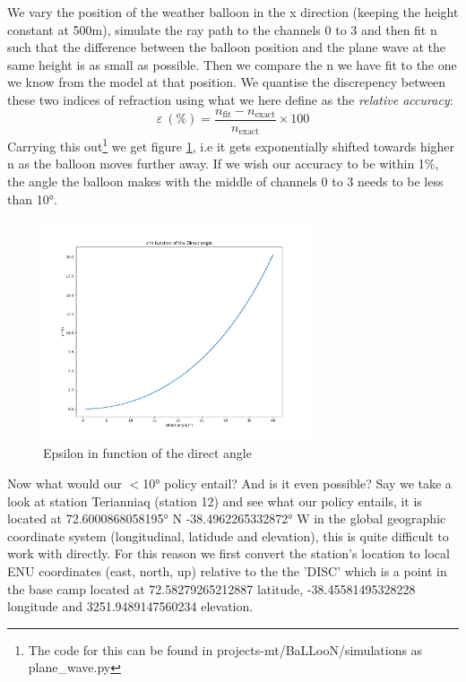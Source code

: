 \documentclass[11pt,a4paper,faculty=we,language=en,doctype=report]{cls/ugent-doc}
\begin{document}
We vary the position of the weather balloon in the x direction (keeping the
height constant at 500m), simulate the ray path to the channels 0 to 3 and then fit n
such that the difference between the balloon position and the plane wave at the same
height is as small as possible.  Then we compare the n we have fit to the
one we know from the model at that position.  We quantise the discrepency
between these two indices of refraction using what we here define as the
\textit{relative accuracy}:
\begin{equation}
  \varepsilon\ (\%) = \frac{n_\text{fit} - n_{\text{exact}}}{n_{\text{exact}}} \times 100
\end{equation}
Carrying this out\footnote{The code for this can be found in projects-mt/BaLLooN/simulations as plane\_wave.py} we get figure \ref{fig:EpsilonIFODirect}, i.e it gets
exponentially shifted towards higher n as the balloon moves further away. If we wish our
accuracy to be within 1\%, the angle the balloon makes with the middle of channels 0 to 3 needs
to be less than 10°.
\begin{figure}
	\centering
	\includegraphics[width=0.7\textwidth]{EpsilonIFODirect.pdf}
	\caption{Epsilon in function of the direct angle}
	\label{fig:EpsilonIFODirect}
\end{figure}
Now what would our $<$10° policy entail? And is it even possible?  Say we take
a look at station Terianniaq (station 12) and see what our policy entails,
it is located at 72.6000868058195° N -38.4962265332872° W in the global geographic
coordinate system (longitudinal, latidude and elevation), this is quite
difficult to work with directly. For this reason we first convert the station's location to 
local ENU coordinates (east, north, up) relative to the the 'DISC' which is a point in the base camp located at
72.58279265212887 latitude, -38.45581495328228 longitude and 3251.9489147560234 elevation.  
\end{document}
